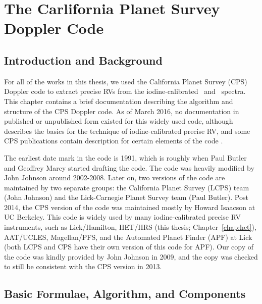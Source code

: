 \chapter{The Carlifornia Planet Survey Doppler Code}\label{chap:doppler}

\section{Introduction and Background}

For all of the works in this thesis, we used the California Planet
Survey (CPS) Doppler code to extract precise RVs from the
iodine-calibrated \het\ and \keck\ spectra. This chapter contains a
brief documentation describing the algorithm and structure of the CPS
Doppler code. As of March 2016, no documentation in published or
unpublished form existed for this widely used code, although
\cite{butler1996} describes the basics for the technique of
iodine-calibrated precise RV, and some CPS publications contain
description for certain elements of the code
\citep[e.g.,][]{2006ApJ...647..600J, 2009ApJ...696...75H,
2011ApJ...726...73H, 2011ApJS..197...26J}.

The earliest date mark in the code is 1991, which is roughly when Paul
Butler and Geoffrey Marcy started drafting the code. The code was
heavily modified by John Johnson around 2002-2008. Later on, two
versions of the code are maintained by two separate groups: the
California Planet Survey (LCPS) team (John Johnson) and the
Lick-Carnegie Planet Survey team (Paul Butler). Post 2014, the CPS
version of the code was maintained mostly by Howard Isaacson at UC
Berkeley. This code is widely used by many iodine-calibrated
precise RV instruments, such as Lick/Hamilton, HET/HRS (this thesis;
Chapter~\ref{chap:het}), AAT/UCLES, Magellan/PFS, and the Automated
Planet Finder (APF) at Lick (both LCPS and CPS have their own version
of this code for APF). Our copy of the code was kindly provided by
John Johnson in 2009, and the copy was checked to still be consistent
with the CPS version in 2013.


\section{Basic Formulae, Algorithm, and Components}

